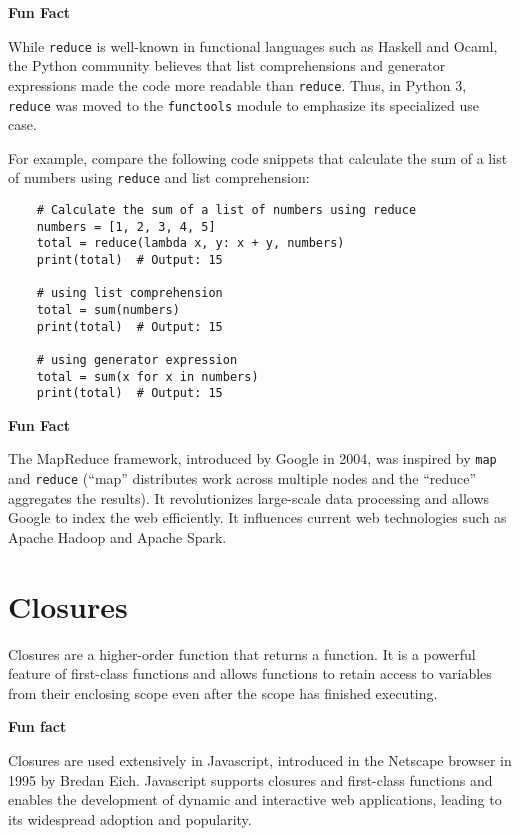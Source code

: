 \documentclass[oneside,11pt,dvipsnames]{book}
\newenvironment{historybox}[1][]{
  \small
  \begin{myhistorybox}
    {\small \textbf{#1}}
  }{
  \end{myhistorybox}
}
\newcommand{\code}[1]{\texttt{#1}}
\begin{document}
\begin{historybox}[Fun Fact] 
    While \code{reduce} is well-known in functional languages such as Haskell and Ocaml, the Python community believes that list comprehensions and generator expressions made the code more readable than \code{reduce}. Thus, in Python 3, \code{reduce} was moved to the \code{functools} module to emphasize its specialized use case.

    For example, compare the following code snippets that calculate the sum of a list of numbers using \code{reduce} and list comprehension:
    \begin{lstlisting}
    # Calculate the sum of a list of numbers using reduce
    numbers = [1, 2, 3, 4, 5]
    total = reduce(lambda x, y: x + y, numbers)
    print(total)  # Output: 15
    
    # using list comprehension
    total = sum(numbers)
    print(total)  # Output: 15
    
    # using generator expression
    total = sum(x for x in numbers)
    print(total)  # Output: 15
    \end{lstlisting}    
\end{historybox}


\begin{historybox}[Fun Fact]
The MapReduce framework, introduced by Google in 2004, was inspired by \code{map} and \code{reduce} (``map'' distributes work across multiple nodes and the ``reduce'' aggregates the results).  It revolutionizes large-scale data processing and allows Google to index the web efficiently. It influences current web technologies such as Apache Hadoop and Apache Spark.
\end{historybox}

\section{Closures}
Closures are a higher-order function that returns a function. It is a powerful feature of first-class functions and allows functions to retain access to variables from their enclosing scope even after the scope has finished executing.

\begin{historybox}[Fun fact] 
    Closures are used extensively in Javascript, introduced in the Netscape browser in 1995 by Bredan Eich. Javascript supports closures and first-class functions and enables the development of dynamic and interactive web applications, leading to its widespread adoption and popularity.
\end{historybox}
\end{document}

